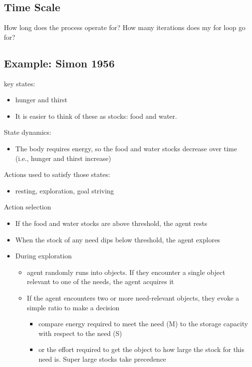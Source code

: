 \documentclass[english,,man]{apa6}
\providecommand{\tightlist}{%
  \setlength{\itemsep}{0pt}\setlength{\parskip}{0pt}}
\theoremstyle{definition}
\theoremstyle{definition}
\theoremstyle{definition}
\theoremstyle{remark}
\begin{document}
\hypertarget{time-scale}{%
\subsection{Time Scale}\label{time-scale}}

How long does the process operate for? How many iterations does my for
loop go for?

\hypertarget{example-simon-1956}{%
\subsection{Example: Simon 1956}\label{example-simon-1956}}

key states:

\begin{itemize}
\tightlist
\item
  hunger and thirst
\item
  It is easier to think of these as stocks: food and water.
\end{itemize}

State dynamics:

\begin{itemize}
\tightlist
\item
  The body requires energy, so the food and water stocks decrease over
  time (i.e., hunger and thirst increase)
\end{itemize}

Actions used to satisfy those states:

\begin{itemize}
\tightlist
\item
  resting, exploration, goal striving
\end{itemize}

Action selection

\begin{itemize}
\item
  If the food and water stocks are above threshold, the agent rests
\item
  When the stock of any need dips below threshold, the agent explores
\item
  During exploration

  \begin{itemize}
  \tightlist
  \item
    agent randomly runs into objects. If they encounter a single object
    relevant to one of the needs, the agent acquires it
  \item
    If the agent encounters two or more need-relevant objects, they
    evoke a simple ratio to make a decision

    \begin{itemize}
    \tightlist
    \item
      compare energy required to meet the need (M) to the storage
      capacity with respect to the need (S)
    \item
      or the effort required to get the object to how large the stock
      for this need is. Super large stocks take precedence
    \end{itemize}
  \end{itemize}
\end{itemize}
\end{document}
